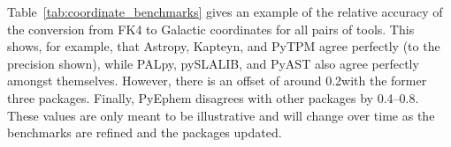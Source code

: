 \documentclass[modern]{aastex61}
\newcommand{\astropy}{Astropy\xspace}
\renewcommand{\tablename}{Table\xspace}
\newcommand{\inlinecomment}[2]{\todo[inline]{#1: #2}\xspace}
\begin{document}
\tablename~\ref{tab:coordinate_benchmarks} gives an example of the relative
accuracy of the conversion from FK4 to Galactic coordinates for all pairs of
tools. This shows, for example, that \astropy, Kapteyn, and PyTPM agree
perfectly (to the precision shown), while PALpy, pySLALIB, and PyAST also
agree perfectly amongst themselves. However, there is an offset of around
0.2\arcsec\space with the former three packages. Finally, PyEphem disagrees
with other packages by 0.4--0.8\arcsec. These values are only meant to be
illustrative and will change over time as the benchmarks are refined and the
packages updated.
\end{document}

